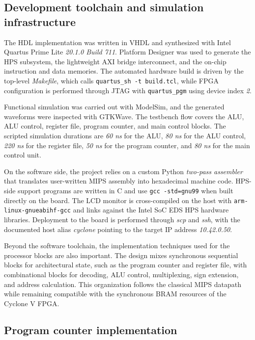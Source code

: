 \documentclass[a4paper,11pt]{scrartcl}
\begin{document}
\subsection{Development toolchain and simulation infrastructure}
\label{sec:orga99c575}

The HDL implementation was written in VHDL and synthesized with Intel Quartus Prime Lite \emph{20.1.0 Build 711}. Platform Designer was used to generate the HPS subsystem, the lightweight AXI bridge interconnect, and the on-chip instruction and data memories. The automated hardware build is driven by the top-level \emph{Makefile}, which calls \texttt{quartus\_sh -t build.tcl}, while FPGA configuration is performed through JTAG with \texttt{quartus\_pgm} using device index \emph{2}.

Functional simulation was carried out with ModelSim, and the generated waveforms were inspected with GTKWave. The testbench flow covers the ALU, ALU control, register file, program counter, and main control blocks. The scripted simulation durations are \emph{60 ns} for the ALU, \emph{80 ns} for the ALU control, \emph{220 ns} for the register file, \emph{50 ns} for the program counter, and \emph{80 ns} for the main control unit.

On the software side, the project relies on a custom Python \emph{two-pass assembler} that translates user-written MIPS assembly into hexadecimal machine code. HPS-side support programs are written in C and use \texttt{gcc -std=gnu99} when built directly on the board. The LCD monitor is cross-compiled on the host with \texttt{arm-linux-gnueabihf-gcc} and links against the Intel SoC EDS HPS hardware libraries. Deployment to the board is performed through \emph{scp} and \emph{ssh}, with the documented host alias \emph{cyclone} pointing to the target IP address \emph{10.42.0.50}.

Beyond the software toolchain, the implementation techniques used for the processor blocks are also important. The design mixes synchronous sequential blocks for architectural state, such as the program counter and register file, with combinational blocks for decoding, ALU control, multiplexing, sign extension, and address calculation. This organization follows the classical MIPS datapath while remaining compatible with the synchronous BRAM resources of the Cyclone V FPGA.
\subsection{Program counter implementation}
\label{sec:orgd5716a4}
\end{document}
